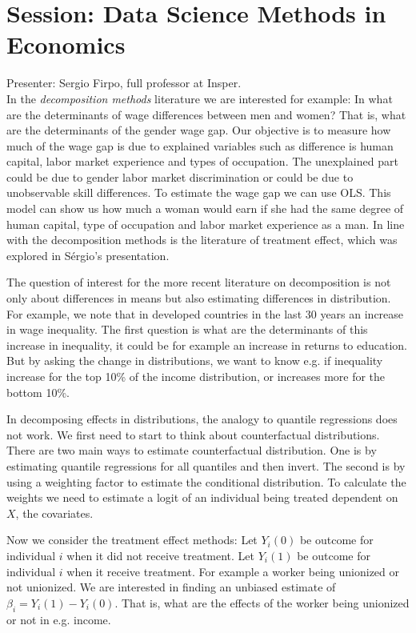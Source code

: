 \documentclass[9pt,a4paper]{article}
\begin{document}
\section*{Session: Data Science  Methods in  Economics}

Presenter: Sergio Firpo, full professor at Insper.\\


In the \textit{decomposition methods} literature we are interested for example:
In what are the determinants of wage differences between men and women?
That is, what are the determinants of the gender wage gap. 
Our objective is to measure how much of the wage gap is due to explained variables such as difference is human capital, labor market experience and types of occupation. 
The unexplained part could be due to gender labor market discrimination or could be due to unobservable skill differences.
To estimate the wage gap we can use OLS. 
This model can show us how much a woman would earn if she had the same degree of human capital, type of occupation and labor market experience as a man. 
In line with the decomposition methods is the literature of treatment effect, which was explored in Sérgio's presentation.

The question of interest for the more recent literature on decomposition is not only about differences in means but also estimating differences in distribution. For example, we note that in developed countries in the last 30 years an increase in wage inequality. 
The first question is what are the determinants of this increase in inequality, it could be for example an increase in returns to education. But by asking the change in distributions, we want to know e.g. if inequality increase for the top 10\% of the income distribution, or increases more for the bottom 10\%. 

In decomposing effects in distributions, the analogy to quantile regressions does not work. 
We first need to start to think about counterfactual distributions. 
There are two main ways to estimate counterfactual distribution. One is by estimating quantile regressions for all quantiles and then invert.  The second is by using a weighting factor to estimate the conditional distribution. 
To calculate the weights we need to estimate a logit of an individual being treated dependent on $X$, the covariates. 

Now we consider the treatment effect methods:
Let $Y_i(0)$ be outcome for individual $i$ when it did not receive treatment. Let $Y_i(1)$ be outcome for individual $i$ when it receive treatment. For example a worker being unionized or not unionized. We are interested in finding an unbiased estimate of $ \beta_i = Y_i(1) - Y_i(0)  $. 
That is, what are the effects of the worker being unionized or not in e.g. income.
\end{document}
